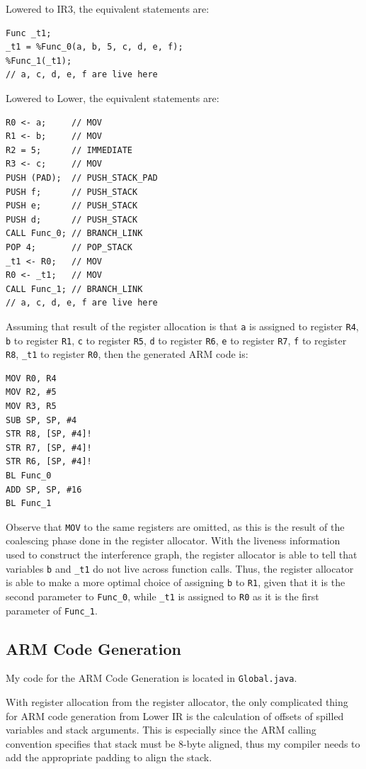 \documentclass[nonacm, acmsmall, screen, 10pt]{acmart}
\begin{document}
Lowered to IR3, the equivalent statements are:
\begin{verbatim}
Func _t1;
_t1 = %Func_0(a, b, 5, c, d, e, f);
%Func_1(_t1);
// a, c, d, e, f are live here
\end{verbatim}

Lowered to Lower, the equivalent statements are:
\begin{verbatim}
R0 <- a;     // MOV
R1 <- b;     // MOV
R2 = 5;      // IMMEDIATE
R3 <- c;     // MOV
PUSH (PAD);  // PUSH_STACK_PAD
PUSH f;      // PUSH_STACK
PUSH e;      // PUSH_STACK
PUSH d;      // PUSH_STACK
CALL Func_0; // BRANCH_LINK
POP 4;       // POP_STACK
_t1 <- R0;   // MOV
R0 <- _t1;   // MOV
CALL Func_1; // BRANCH_LINK
// a, c, d, e, f are live here
\end{verbatim}

Assuming that result of the register allocation is that \texttt{a} is assigned to register \texttt{R4}, \texttt{b} to register \texttt{R1}, \texttt{c} to register \texttt{R5}, \texttt{d} to register \texttt{R6}, \texttt{e} to register \texttt{R7}, \texttt{f} to register \texttt{R8}, \texttt{\_t1} to register \texttt{R0}, then the generated ARM code is:
\begin{verbatim}
MOV R0, R4
MOV R2, #5
MOV R3, R5
SUB SP, SP, #4
STR R8, [SP, #4]!
STR R7, [SP, #4]!
STR R6, [SP, #4]!
BL Func_0
ADD SP, SP, #16
BL Func_1
\end{verbatim}

Observe that \texttt{MOV} to the same registers are omitted, as this is the result of the coalescing phase done in the register allocator.
With the liveness information used to construct the interference graph, the register allocator is able to tell that variables \texttt{b} and \texttt{\_t1} do not live across function calls.
Thus, the register allocator is able to make a more optimal choice of assigning \texttt{b} to \texttt{R1}, given that it is the second parameter to \texttt{Func\_0}, while \texttt{\_t1} is assigned to \texttt{R0} as it is the first parameter of \texttt{Func\_1}.

\subsection{ARM Code Generation}
My code for the ARM Code Generation is located in \texttt{Global.java}.

With register allocation from the register allocator, the only complicated thing for ARM code generation from Lower IR is the calculation of offsets of spilled variables and stack arguments.
This is especially since the ARM calling convention specifies that stack must be 8-byte aligned, thus my compiler needs to add the appropriate padding to align the stack.
\end{document}
